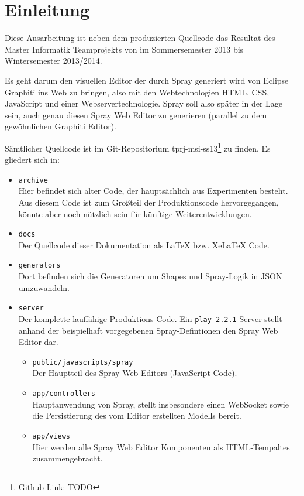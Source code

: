 \section{Einleitung}

Diese Ausarbeitung ist neben dem produzierten Quellcode das Resultat des
Master Informatik Teamprojekts von \autor im Sommersemester 2013 bis
Wintersemester 2013/2014.

Es geht darum den visuellen Editor der durch Spray generiert wird
von Eclipse Graphiti ins Web zu bringen, also mit den Webtechnologien
HTML, CSS, JavaScript und einer Webservertechnologie.
Spray soll also später in der Lage sein, auch genau diesen Spray
Web Editor zu generieren (parallel zu dem gewöhnlichen Graphiti Editor).

Sämtlicher Quellcode ist im Git-Repositorium
tprj-msi-ss13\footnote{Github Link: \url{TODO}} zu finden.
Es gliedert sich in:

\begin{itemize}
  \item {\tt archive} \\
  Hier befindet sich alter Code, der hauptsächlich aus Experimenten besteht.
  Aus diesem Code ist zum Großteil der Produktionscode hervorgegangen,
  könnte aber noch nützlich sein für künftige Weiterentwicklungen.
  \item {\tt docs} \\
  Der Quellcode dieser Dokumentation als LaTeX bzw. XeLaTeX Code.
  \item {\tt generators} \\
  Dort befinden sich die Generatoren um Shapes und Spray-Logik in JSON umzuwandeln.
  \item {\tt server} \\
  Der komplette lauffähige Produktions-Code.
  Ein {\tt play 2.2.1} Server stellt anhand der beispielhaft vorgegebenen
  Spray-Defintionen den Spray Web Editor dar.
  \begin{itemize}
    \item {\tt public/javascripts/spray} \\
    Der Hauptteil des Spray Web Editors (JavaScript Code).
    \item {\tt app/controllers} \\
    Hauptanwendung von Spray, stellt insbesondere einen WebSocket sowie die
    Persistierung des vom Editor erstellten Modells bereit.
    \item {\tt app/views} \\
    Hier werden alle Spray Web Editor Komponenten als HTML-Tempaltes zusammengebracht.
  \end{itemize}
\end{itemize}

